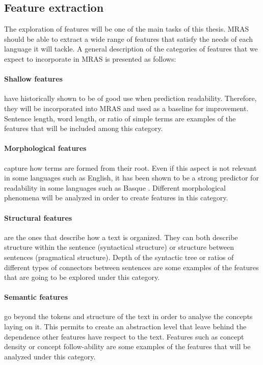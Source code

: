 \documentclass[12pt]{article}
\begin{document}
\subsection{Feature extraction}
The exploration of features will be one of the main tasks of this thesis. MRAS should be able to extract a wide range of features that satisfy the needs of each language it will tackle. A general description of the categories of features that we expect to incorporate in MRAS is presented as follows:



\paragraph{Shallow features}
\cite{flesch1948new,chall1995readability,albright1996readability} have historically shown to be of good use when prediction readability. Therefore, they will be incorporated into MRAS and used as a baseline for improvement. Sentence length, word length, or ratio of simple terms are examples of the features that will be included among this category.



\paragraph{Morphological features}
capture how terms are formed from their root. Even if this  aspect is not relevant in some languages such as English, it has been shown to be a strong predictor for readability in some languages such as Basque \cite{gonzalez2014simple}. Different morphological phenomena will be analyzed in order to create features in this category.

\paragraph{Structural features}
 are the ones that describe how a text is organized. They can both describe structure within the sentence (syntactical structure) or structure between sentences (pragmatical structure). Depth of the syntactic tree or ratios of different types of connectors between sentences are some examples of the features that are going to be explored under this category.

\paragraph{Semantic features}
 go beyond the tokens and structure of the text in order to analyse the concepts laying on it. This permits to create an abstraction level that leave behind the dependence other features have respect to the text. Features such as concept density or concept follow-ability are some examples of the features that will be analyzed under this category.\\
\end{document}
